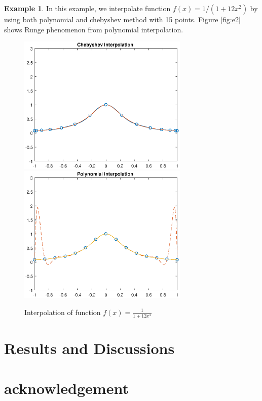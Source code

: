 \documentclass[12pt]{amsart}
\theoremstyle{definition}
\newtheorem{exmp}{Example}[section]
\begin{document}
\begin{exmp}
In this example, we interpolate function $f(x)=1/(1+12x^2)$ by using both polynomial and chebyshev method with 15 points. Figure \eqref{fig:e2} shows Runge phenomenon from polynomial interpolation.\\
\begin{figure}     	\centerline{\includegraphics[width=3.2in]{e2a.eps}
      	\hspace{-6pt}
     	\includegraphics[width=3.2in]{e2b.eps}}
     	\hspace{-6pt}
		\caption{Interpolation of function $f(x)=\frac{1}{1+12x^2}$}
        \label{fig:e2}
\end{figure}
\end{exmp}

\section{Results and Discussions}
\section{acknowledgement}
\end{document}
